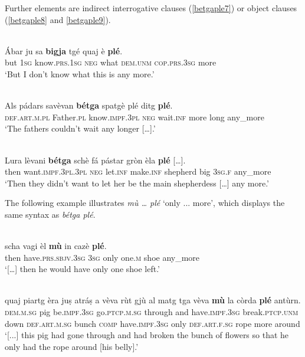 Further elements are indirect interrogative clauses (\ref{betgaple7}) or object clauses (\ref{betgaple8} and \ref{betgaple9}).

\ea
\label{betgaple7}
\\
\gll Ábar ju sa \textbf{bigja} tgé quaj è \textbf{plé}.\\
but \textsc{1sg} know.\textsc{prs.1sg} \textsc{neg} what \textsc{dem.unm} \textsc{cop.prs.3sg} more\\
\glt `But I don't know what this is any more.'
\z

\ea
\label{betgaple8}
 {\citealt[147]{Büchli1966}}\\
\gll    Als pádars savèvan \textbf{bétga} spatgè plé ditg \textbf{plé}.\\
      \textsc{def.art.m.pl} Father.\textsc{pl} know.\textsc{impf.3pl} \textsc{neg} wait.\textsc{inf} more long any\_more\\
\glt `The fathers couldn’t wait any longer […].'
\z

\ea
\label{betgaple9}
 {\citealt[119]{Büchli1966}}\\
\gll    Lura lèvani \textbf{bétga} schè fá pástar gròn èla \textbf{plé} […].\\
     then want.\textsc{impf.3pl.3pl} \textsc{neg} let.\textsc{inf} make.\textsc{inf} shepherd big \textsc{3sg.f} any\_more\\
\glt `Then they didn’t want to let her be the main shepherdess […] any more.'
\z

The following example illustrates \textit{mù … plé} `only ... more', which displays the same syntax as \textit{bétga plé}.

\ea
\label{}
 {\citealt[15]{Büchli1966}}\\
\gll  [...] scha vagi èl \textbf{mù} in cazè \textbf{plé}.\\
then have.\textsc{prs.sbjv.3sg} \textsc{3sg} only one.\textsc{m} shoe any\_more \\
\glt `[…] then he would have only one shoe left.'
\z

\ea
\label{}
\\
\gll    [..] quaj piartg èra juṣ atráṣ a vèva rùt gjù al matg tga vèva \textbf{mù} la còrda \textbf{plé} antùrn.\\
{} \textsc{dem.m.sg} pig be.\textsc{impf.3sg} go.\textsc{ptcp.m.sg} through and have.\textsc{impf.3sg} break.\textsc{ptcp.unm} down \textsc{def.art.m.sg} bunch  \textsc{comp} have.\textsc{impf.3sg} only \textsc{def.art.f.sg} rope more around\\
\glt `[...] this pig had gone through and had broken the bunch of flowers so that he only had the rope around [his belly].'
\z

